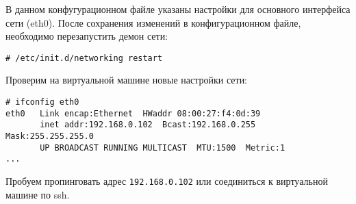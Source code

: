В данном конфугурационном файле указаны настройки для основного интерфейса сети (eth0).
После сохранения изменений в конфигурационном файле, необходимо перезапустить демон сети:
\begin{lstlisting}
# /etc/init.d/networking restart
\end{lstlisting}

Проверим на виртуальной машине новые настройки сети:
\begin{lstlisting}
# ifconfig eth0
eth0   Link encap:Ethernet  HWaddr 08:00:27:f4:0d:39
       inet addr:192.168.0.102  Bcast:192.168.0.255  Mask:255.255.255.0
       UP BROADCAST RUNNING MULTICAST  MTU:1500  Metric:1
...
\end{lstlisting}

Пробуем пропинговать адрес \texttt{192.168.0.102} или соединиться к виртуальной машине по ssh.

\clearpage
